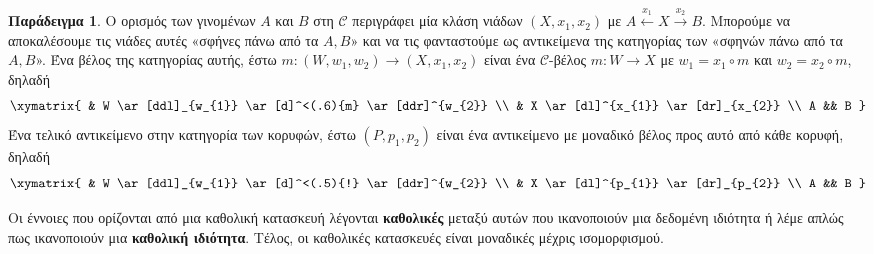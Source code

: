 \documentclass [a4paper,11pt] {book}
\theoremstyle{definition}
\newtheorem{example}[theorem]{Παράδειγμα}
\theoremstyle{definition}
\begin{document}
\begin{example}\label{exampleOfUniCon}
O ορισμός των γινομένων $A$ και $B$ στη $\mathcal{C}$ περιγράφει μία κλάση νιάδων $(X,x_{1},x_{2})$ με $A\xleftarrow{x_{1}}X\xrightarrow{x_{2}} B$. Μπορούμε να αποκαλέσουμε τις νιάδες αυτές «σφήνες πάνω από τα $A,B$» και να τις φανταστούμε ως αντικείμενα της κατηγορίας των «σφηνών πάνω από τα $A,B$». Ένα βέλος της κατηγορίας αυτής, έστω $m:(W,w_{1},w_{2})\to (X,x_{1},x_{2})$ είναι ένα $\mathcal{C}$-βέλος $m:W\to X$ με $w_{1}=x_{1}\circ m$ και $w_{2}=x_{2}\circ m$, δηλαδή
\begin{displaymath}
\xymatrix{
& W \ar[ddl]_{w_{1}} \ar[d]^<(.6){m} \ar[ddr]^{w_{2}} \\
& X \ar[dl]^{x_{1}} \ar[dr]_{x_{2}} \\
A && B
}
\end{displaymath}
Ένα τελικό αντικείμενο στην κατηγορία των κορυφών, έστω $(P,p_{1},p_{2})$ είναι ένα αντικείμενο με μοναδικό βέλος προς αυτό από κάθε κορυφή, δηλαδή
\begin{displaymath}
\xymatrix{
& W \ar[ddl]_{w_{1}} \ar[d]^<(.5){!} \ar[ddr]^{w_{2}} \\
& X \ar[dl]^{p_{1}} \ar[dr]_{p_{2}} \\
A && B
}
\end{displaymath}
\end{example}
Οι έννοιες που ορίζονται από μια καθολική κατασκευή λέγονται \textbf{καθολικές} μεταξύ αυτών που ικανοποιούν μια δεδομένη ιδιότητα ή λέμε απλώς πως ικανοποιούν μια \textbf{καθολική ιδιότητα}. Τέλος, οι καθολικές κατασκευές είναι μοναδικές μέχρις ισομορφισμού.
\end{document}
